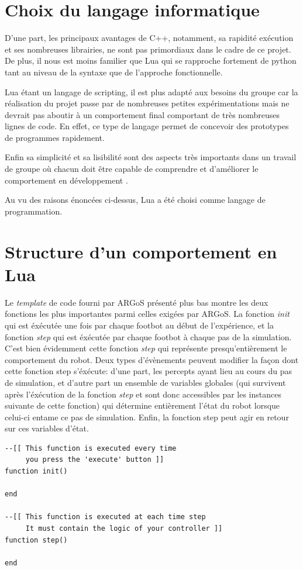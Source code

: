 \section{Choix du langage informatique}

D'une part, les principaux avantages de C++, notamment, sa rapidité exécution et ses nombreuses librairies, ne sont pas primordiaux dans le cadre de ce projet. De plus, il nous est moins familier que Lua qui se rapproche fortement de python tant au niveau de la syntaxe que de l'approche fonctionnelle.

Lua étant un langage de scripting, il est plus adapté aux besoins du groupe car la réalisation du projet passe par de nombreuses petites expérimentations mais ne devrait pas aboutir à un comportement final comportant de très nombreuses lignes de code. En effet, ce type de langage permet de concevoir des prototypes de programmes rapidement.

Enfin sa simplicité et sa lisibilité sont des aspects très importants dans un travail de groupe où chacun doit être capable de comprendre et d'améliorer le comportement en développement \cite{compC++,compLua}.

Au vu des raisons énoncées ci-dessus, Lua a été choisi comme langage de programmation.

\section{Structure d'un comportement en Lua}

Le \emph{template} de code fourni par ARGoS présenté plus bas montre les deux fonctions les plus importantes parmi celles exigées par ARGoS. La fonction \emph{init} qui est éxécutée une fois par chaque footbot au début de l'expérience, et la fonction \emph{step} qui est éxécutée par chaque footbot à chaque pas de la simulation. C'est bien évidemment cette fonction \emph{step} qui représente presqu'entièrement le comportement du robot. Deux types d'évènements peuvent modifier la façon dont cette fonction step s'éxécute: d'une part, les percepts ayant lieu au cours du pas de simulation, et d'autre part un ensemble de variables globales (qui survivent après l'éxécution de la fonction \emph{step} et sont donc accessibles par les instances suivante de cette fonction) qui détermine entièrement l'état du robot lorsque celui-ci entame ce pas de simulation. Enfin, la fonction step peut agir en retour sur ces variables d'état.~\cite{argosSite1}
\begin{lstlisting}[caption=Structure de base d'un comportement en Lua]
--[[ This function is executed every time
     you press the 'execute' button ]]
function init()

end

--[[ This function is executed at each time step
     It must contain the logic of your controller ]]
function step()

end
\end{lstlisting}

